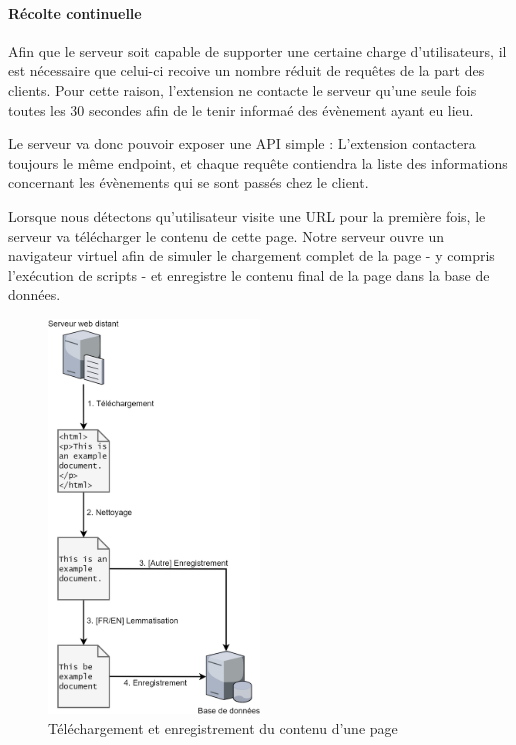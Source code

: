 			\paragraph{Récolte continuelle\label{d-recolte}}

				Afin que le serveur soit capable de supporter une certaine charge d'utilisateurs, il est nécessaire que celui-ci recoive un nombre réduit de requêtes de la part des clients. Pour cette raison, l'extension ne contacte le serveur qu'une seule fois toutes les 30 secondes afin de le tenir informaé des évènement ayant eu lieu.

				Le serveur va donc pouvoir exposer une API simple : L'extension contactera toujours le même endpoint, et chaque requête contiendra la liste des informations concernant les évènements qui se sont passés chez le client.

				Lorsque nous détectons qu'utilisateur visite une URL pour la première fois, le serveur va télécharger le contenu de cette page. Notre serveur ouvre un navigateur virtuel afin de simuler le chargement complet de la page - y compris l'exécution de scripts - et enregistre le contenu final de la page dans la base de données.

				\begin{figure}[!h]
					\centering
					\includegraphics[width=0.5\textwidth]{images/design/data1_big}
					\caption{Téléchargement et enregistrement du contenu d'une page}
					\label{d-download-page}
				\end{figure}

